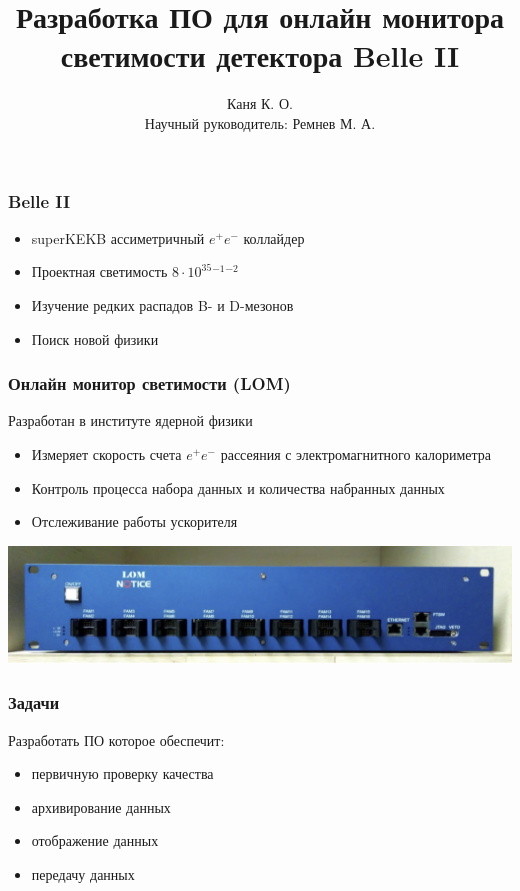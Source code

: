 \documentclass{beamer}
\title{Разработка ПО для онлайн монитора светимости детектора Belle II}
\author{Каня К. О. \\
        Научный руководитель: Ремнев М. А.}
\institute{Новосибирский Государственный Университет}
\begin{document}
\begin{frame}
\titlepage
\end{frame}

\begin{frame}
\frametitle{Belle II}
    \begin{itemize}
        \item superKEKB ассиметричный $e^+e^-$ коллайдер
        \item Проектная светимость $8\cdot10^{35}$$^{-1}$$^{-2}$
        \item Изучение редких распадов B- и D-мезонов
        \item Поиск новой физики
    \end{itemize}
\end{frame}


\begin{frame}
\frametitle{Онлайн монитор светимости (LOM)}
Разработан в институте ядерной физики
    \begin{itemize}
        \item Измеряет скорость счета $e^+e^-$ рассеяния с электромагнитного калориметра
        \item Контроль процесса набора данных и количества набранных данных
        \item Отслеживание работы ускорителя
    \end{itemize}
    \includegraphics[width=\textwidth]{LOM_picture}
\end{frame}



\begin{frame}
\frametitle{Задачи}
    Разработать ПО которое обеспечит:
    \begin{itemize}
        \item первичную проверку качества
        \item архивирование данных
        \item отображение данных
        \item передачу данных
    \end{itemize}
\end{frame}
\end{document}
